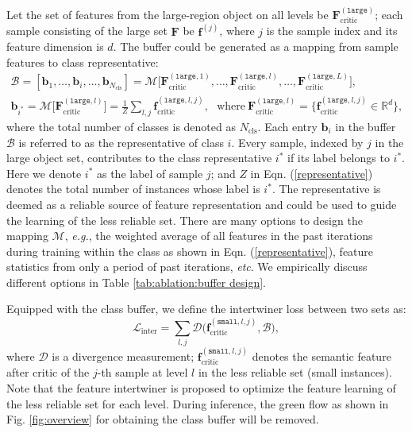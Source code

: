 \documentclass{article} \usepackage{iclr2019_conference,times}
\begin{document}
Let the set of features from the large-region object on all levels be $\mathbf{F}_{\text{critic}}^{(\texttt{large})}$;
each sample consisting of the large set $\mathbf{F}$ be $\bm{f}^{(j)}$, where $j$ is the sample index and its feature dimension is $d$.
The buffer could be generated as a mapping from sample features to class representative:
\begin{gather}
\mathcal{B} = [\bm{b}_1, \dots, \bm{b}_i, \dots, \bm{b}_{N_{\text{cls}}}] = \mathcal{M}  \bigg[ \mathbf{F}_{\text{critic}}^{(\texttt{large}, 1)}, \ldots, \mathbf{F}_{\text{critic}}^{(\texttt{large}, l)}, \ldots, \mathbf{F}_{\text{critic}}^{(\texttt{large}, L)} \bigg], \\
{
\bm{b}_{i^*} = \mathcal{M}\Big[\mathbf{F}_{\text{critic}}^{(\texttt{large}, l)} \Big] =
\frac{1}{Z} \sum_{l, j} \bm{f}_{\text{critic}}^{(\texttt{large}, l, j)},~~~\text{where}~\mathbf{F}_{\text{critic}}^{(\texttt{large}, l)}=\{\bm{f}_{\text{critic}}^{(\texttt{large}, l, j)}\in \mathbb{R}^{d} \}, \label{representative}
}
\end{gather}
where the total number of classes is denoted as $N_{\text{cls}}$.
Each entry $\bm{b}_i$ in the buffer $\mathcal{B}$ is referred to as the representative of class $i$. Every sample, indexed by $j$ in the large object set, contributes to the class representative $i^*$ if its label belongs to $i^*$.
Here we denote $i^*$ as the label of sample $j$;
and $Z$ in Eqn. (\ref{representative}) denotes the total number of instances whose label is $i^*$.
The representative is deemed as a reliable source of feature representation and could be used to guide the learning of the less reliable set.
There are many options to design the mapping $\mathcal{M}$, \textit{e.g.}, the weighted average of 
all features in the past iterations during training within the class 
as shown in Eqn. (\ref{representative}), feature statistics from only a period of past iterations, \textit{etc}. We empirically 
discuss different options in Table \ref{tab:ablation:buffer design}. 

Equipped with the class buffer, we define the intertwiner loss between two sets as:
\begin{equation}
\mathcal{L}_{\text{inter}} = \sum_{l, j} \mathcal{D} \big(  \bm{f}_{\text{critic}}^{(\texttt{small}, l, j)}, \mathcal{B} \big),
\end{equation}
where $\mathcal{D} $ is a divergence measurement;
$\bm{f}_{\text{critic}}^{(\texttt{small}, l, j)}$ denotes the semantic feature after critic of the $j$-th sample at level $l$ in the less reliable set (small instances).
Note that the feature intertwiner is proposed to
optimize the feature learning of the less reliable set for each level. During inference, the green flow as shown in Fig. \ref{fig:overview} for obtaining the class buffer will be removed.
\end{document}
